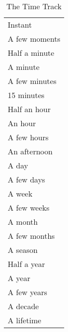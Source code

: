 
\begin{wraptable}{l}[1cm]{5cm}
\centering
\begin{tabular}{l}
\toprule
Instant \\
A few moments \\
Half a minute \\
A minute \\
A few minutes \\
15 minutes \\
Half an hour \\
An hour \\
A few hours \\
An afternoon \\
A day \\
A few days \\
A week \\
A few weeks \\
A month \\
A few months \\
A season \\
Half a year \\
A year \\
A few years \\
A decade \\
A lifetime \\
\bottomrule
\end{tabular}
\caption[The Time Track]{The Time Track}
\label{tab:the-time-track}
\end{wraptable}

